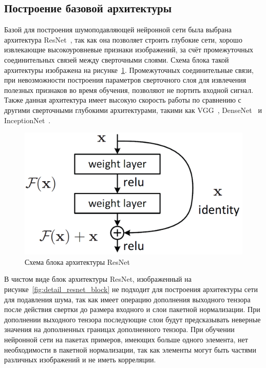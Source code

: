 \subsection{Построение базовой архитектуры}
\label{sec:resnet_block}


Базой для построения шумоподавляющей нейронной сети была выбрана архитектура ResNet~\autocite{ResNetPaper}, так как она позволяет строить глубокие сети, хорошо извлекающие высокоуровневые признаки изображений, за счёт промежуточных соединительных связей между сверточными слоями. Схема блока такой архитектуры изображена на рисунке~\ref{fig:resnet_block}. Промежуточных соединительные связи, при невозможности построения параметров сверточного слоя для извлечения полезных признаков во время обучения, позволяют не портить входной сигнал. Также данная архитектура имеет высокую скорость работы по сравнению с другими сверточными глубокими архитектурами, такими как VGG~\autocite{VGGPaper}, DenseNet~\autocite{DenseNetPaper} и InceptionNet~\autocite{InceptionPaper}.

\begin{figure}[h]
	\centering
	\includegraphics[width=\textwidth / 2]{img/resnet}
	\caption{Схема блока архитектуры ResNet}
	\label{fig:resnet_block}
\end{figure}


В чистом виде блок архитектуры ResNet, изображенный на рисунке~\ref{fig:detail_resnet_block} не подходит для построения архитектуры сети для подавления шума, так как имеет операцию дополнения выходного тензора после действия свертки до размера входного и слои пакетной нормализации. При дополнении выходного тензора последующие слои будут предсказывать неверные значения на дополненных границах дополненного тензора. При обучении нейронной сети на пакетах примеров, имеющих больше одного элемента, нет необходимости в пакетной нормализации, так как элементы могут быть частями различных изображений и не иметь корреляции. 

